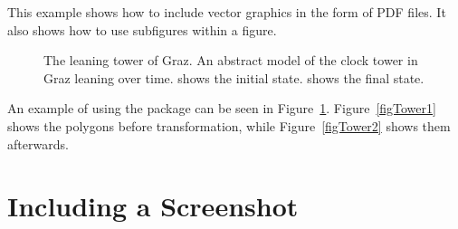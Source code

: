 This example shows how to include vector graphics in the form of PDF
files. It also shows how to use subfigures within a figure.


\begin{figure}[tp]
\centering
{}
\hfill
{}

\caption[Abstract Clock Towers]
{
The leaning tower of Graz. An abstract model of the clock
tower in Graz leaning over time.  shows
the initial state.  shows the final state.
}
\label{figWholeFig}
\end{figure}


An example of using the  package can be seen in
Figure~\ref{figWholeFig}. Figure~\ref{figTower1} shows the polygons
before transformation, while Figure~\ref{figTower2} shows them
afterwards.




\section{Including a Screenshot}


